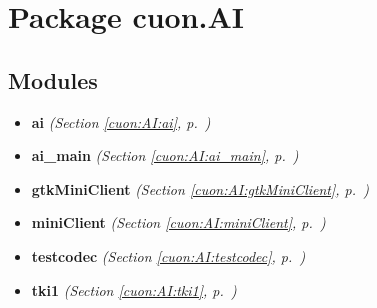 %
%
%


\section{Package cuon.AI}

    \label{cuon:AI}


\subsection{Modules}

\begin{itemize}
\setlength{\parskip}{0ex}
\item \textbf{ai}
  \textit{(Section \ref{cuon:AI:ai}, p.~\pageref{cuon:AI:ai})}

\item \textbf{ai\_main}
  \textit{(Section \ref{cuon:AI:ai_main}, p.~\pageref{cuon:AI:ai_main})}

\item \textbf{gtkMiniClient}
  \textit{(Section \ref{cuon:AI:gtkMiniClient}, p.~\pageref{cuon:AI:gtkMiniClient})}

\item \textbf{miniClient}
  \textit{(Section \ref{cuon:AI:miniClient}, p.~\pageref{cuon:AI:miniClient})}

\item \textbf{testcodec}
  \textit{(Section \ref{cuon:AI:testcodec}, p.~\pageref{cuon:AI:testcodec})}

\item \textbf{tki1}
  \textit{(Section \ref{cuon:AI:tki1}, p.~\pageref{cuon:AI:tki1})}

\end{itemize}



